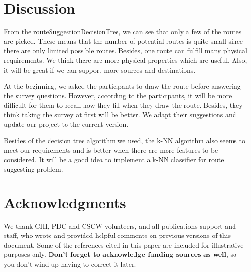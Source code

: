\documentclass{sigchi}
\begin{document}
\section{Discussion}
From the routeSuggestionDecisionTree, we can see that only a few of the routes are picked. These means that the number of potential routes is quite small since there are only limited possible routes. Besides, one route can fulfill many physical requirements. We think there are more physical properties which are useful. Also, it will be great if we can support more sources and destinations.


At the beginning, we asked the participants to draw the route before answering the survey questions. However, according to the participants, it will be more difficult for them to recall how they fill when they draw the route. Besides, they think taking the survey at first will be better. We adapt their suggestions and update our project to the current version.


Besides of the decision tree algorithm we used, the k-NN algorithm also seems to meet our requirements and is better when there are more features to be considered. It will be a good idea to implement a k-NN classifier for route suggesting problem. 

\section{Acknowledgments}

We thank CHI, PDC and CSCW volunteers, and all publications support
and staff, who wrote and provided helpful comments on previous
versions of this document.  Some of the references cited in this paper
are included for illustrative purposes only.  \textbf{Don't forget
to acknowledge funding sources as well}, so you don't wind up
having to correct it later.

\balance



\end{document}
